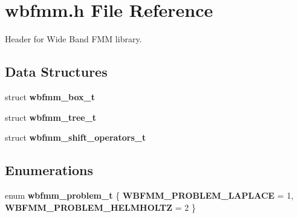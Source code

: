\section{wbfmm.\+h File Reference}
\label{wbfmm_8h}


Header for Wide Band F\+M\+M library.  


\subsection*{Data Structures}
\begin{DoxyCompactItemize}
\item 
struct {\bf wbfmm\+\_\+box\+\_\+t}
\item 
struct {\bf wbfmm\+\_\+tree\+\_\+t}
\item 
struct {\bf wbfmm\+\_\+shift\+\_\+operators\+\_\+t}
\end{DoxyCompactItemize}
\subsection*{Enumerations}
\begin{DoxyCompactItemize}
\item 
enum {\bf wbfmm\+\_\+problem\+\_\+t} \{ {\bf W\+B\+F\+M\+M\+\_\+\+P\+R\+O\+B\+L\+E\+M\+\_\+\+L\+A\+P\+L\+A\+C\+E} = 1, 
{\bf W\+B\+F\+M\+M\+\_\+\+P\+R\+O\+B\+L\+E\+M\+\_\+\+H\+E\+L\+M\+H\+O\+L\+T\+Z} = 2
 \}
\end{DoxyCompactItemize}
